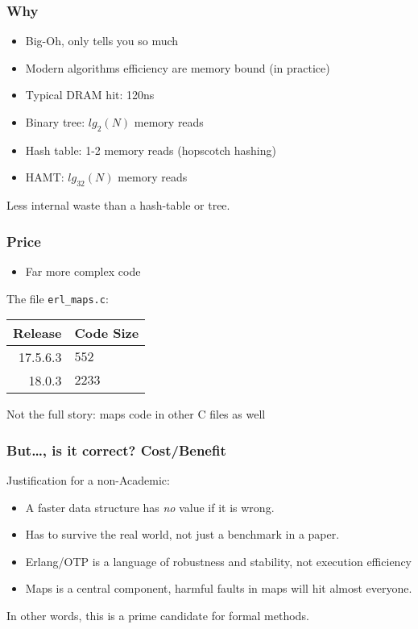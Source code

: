 \documentclass[lualatex]{beamer}
\begin{document}
\begin{frame}
\frametitle{Why}
\begin{itemize}
\item Big-Oh, only tells you so much
\item Modern algorithms efficiency are memory bound (in practice)
\item Typical DRAM hit: 120ns
\item Binary tree: $lg_2(N)$ memory reads
\item Hash table: 1-2 memory reads (hopscotch hashing)
\item HAMT: $lg_{32}(N)$ memory reads
\end{itemize}
Less internal waste than a hash-table or tree.
\end{frame}

\begin{frame}[fragile]
\frametitle{Price}
\begin{itemize}
\item Far more complex code
\end{itemize}

The file \texttt{erl\_maps.c}:\\
\begin{center}
\begin{tabular}[c]{r|l}
Release&Code Size\\
\hline
17.5.6.3 & $552$ \\
18.0.3 & $2233$ \\
\end{tabular}
\end{center}
Not the full story: maps code in other C files as well
\end{frame}

\begin{frame}
\frametitle{But…, is it correct? Cost/Benefit}
Justification for a non-Academic:
\begin{itemize}
\item A faster data structure has \emph{no} value if it is wrong.
\item Has to survive the real world, not just a benchmark in a paper.
\item Erlang/OTP is a language of robustness and stability, not execution efficiency
\item Maps is a central component, harmful faults in maps will hit almost everyone.
\end{itemize}

In other words, this is a prime candidate for formal methods.
\end{frame}
\end{document}
